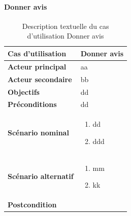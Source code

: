         \paragraph[Donner avis]{Donner avis}
        \begin{longtable}{p{4cm} p{9cm}}
            \caption{Description textuelle du cas d’utilisation Donner avis}
            \label{table:usecaseDonnerAvis}
            \\\hline\hline
                \textbf{Cas d’utilisation} & \textbf{Donner avis}
            \\\hline\hline
                    \textbf{Acteur principal} & aa
                \\
                    \textbf{Acteur secondaire} & bb
                \\
                    \textbf{Objectifs} & dd
                \\
                    \textbf{Préconditions} & dd
                \\
                \textbf{Scénario nominal} &
                    \begin{enumerate}[leftmargin=*]
                        \item dd
                        \item ddd
                    \end{enumerate}
                \\
                \textbf{Scénario alternatif} &
                    \begin{enumerate}[leftmargin=*]
                        \item mm
                        \item kk
                    \end{enumerate}
                \\
                \textbf{Postcondition}
            \\\bottomrule
        \end{longtable}

